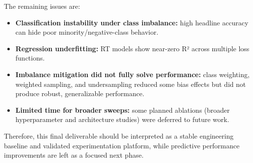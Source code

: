 The remaining issues are:
\begin{itemize}[leftmargin=*]
	\item \textbf{Classification instability under class imbalance:} high headline accuracy can hide poor minority/negative-class behavior.
	\item \textbf{Regression underfitting:} RT models show near-zero R² across multiple loss functions.
	\item \textbf{Imbalance mitigation did not fully solve performance:} class weighting, weighted sampling, and undersampling reduced some bias effects but did not produce robust, generalizable performance.
	\item \textbf{Limited time for broader sweeps:} some planned ablations (broader hyperparameter and architecture studies) were deferred to future work.
\end{itemize}

Therefore, this final deliverable should be interpreted as a stable engineering baseline and validated experimentation platform, while predictive performance improvements are left as a focused next phase.
